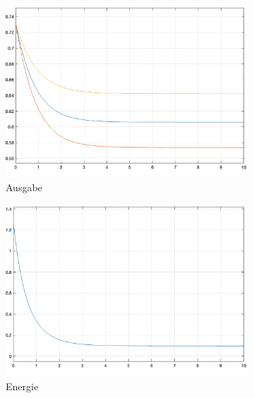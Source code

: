 \begin{figure}[h]
  \centering
  \begin{subfigure}[b]{0.32\textwidth}
    \includegraphics[width=\textwidth]{abbildungen/hnn_simulation_3_ausgabe.png}
    \caption{Ausgabe}
  \end{subfigure}%
  \hfill
  \begin{subfigure}[b]{0.32\textwidth}
    \includegraphics[width=\textwidth]{abbildungen/hnn_simulation_3_energiefunktion.png}
    \caption{Energie}
  \end{subfigure}%
  \hfill
  \begin{subfigure}[b]{0.32\textwidth}

\end{subfigure}
\end{figure}

